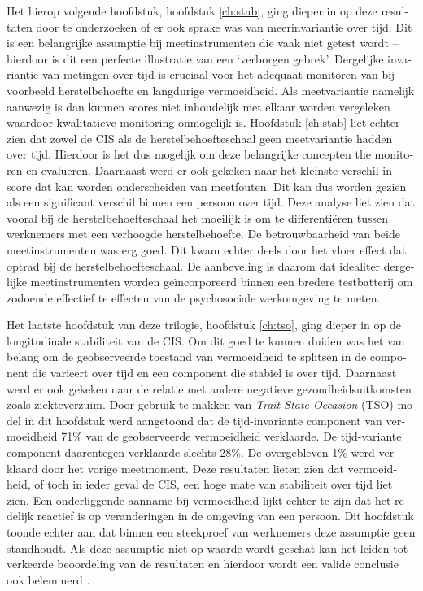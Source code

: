 \begin{otherlanguage}{dutch}
Het hierop volgende hoofdstuk, hoofdstuk \ref{ch:stab}, ging dieper in op deze resultaten door te onderzoeken of er ook sprake was van meerinvariantie over tijd. Dit is een belangrijke assumptie bij meetinstrumenten die vaak niet getest wordt -- hierdoor is dit een perfecte illustratie van een `verborgen gebrek'. Dergelijke invariantie van metingen over tijd is cruciaal voor het adequaat monitoren van bijvoorbeeld herstelbehoefte en langdurige vermoeidheid. Als meetvariantie namelijk aanwezig is dan kunnen scores niet inhoudelijk met elkaar worden vergeleken waardoor kwalitatieve monitoring onmogelijk is. Hoofdstuk \ref{ch:stab} liet echter zien dat zowel de CIS als de herstelbehoefteschaal geen meetvariantie hadden over tijd. Hierdoor is het dus mogelijk om deze belangrijke concepten the monitoren en evalueren. Daarnaast werd er ook gekeken naar het kleinste verschil in score dat kan worden onderscheiden van meetfouten. Dit kan dus worden gezien als een significant verschil binnen een persoon over tijd. Deze analyse liet zien dat vooral bij de herstelbehoefteschaal het moeilijk is om te differenti\"eren tussen werknemers met een verhoogde herstelbehoefte. De betrouwbaarheid van beide meetinstrumenten was erg goed. Dit kwam echter deels door het vloer effect dat optrad bij de herstelbehoefteschaal. De aanbeveling is daarom dat idealiter dergelijke meetinstrumenten worden ge\"incorporeerd binnen een bredere testbatterij om zodoende effectief te effecten van de psychosociale werkomgeving te meten. 

Het laatste hoofdstuk van deze trilogie, hoofdstuk \ref{ch:tso}, ging dieper in op de longitudinale stabiliteit van de CIS. Om dit goed te kunnen duiden was het van belang om de geobserveerde toestand van vermoeidheid te splitsen in de component die varieert over tijd en een component die stabiel is over tijd. Daarnaast werd er ook gekeken naar de relatie met andere negatieve gezondheidsuitkomsten zoals ziekteverzuim. Door gebruik te makken van \textit{Trait-State-Occasion} (TSO) model  \parencite{Prenoveau_2011,Prenoveau_2016} in dit hoofdstuk werd aangetoond dat de tijd-invariante component van vermoeidheid 71\% van de geobserveerde vermoeidheid verklaarde. De tijd-variante component daarentegen verklaarde slechts 28\%. De overgebleven 1\% werd verklaard door het vorige meetmoment. Deze resultaten lieten zien dat vermoeidheid, of toch in ieder geval de CIS, een hoge mate van stabiliteit over tijd liet zien. Een onderliggende aanname bij vermoeidheid lijkt echter te zijn dat het redelijk reactief is op veranderingen in de omgeving van een persoon. Dit hoofdstuk toonde echter aan dat binnen een steekproef van werknemers deze assumptie geen standhoudt. Als deze assumptie niet op waarde wordt geschat kan het leiden tot verkeerde beoordeling van de resultaten en hierdoor wordt een valide conclusie ook belemmerd \parencite{Hamaker_2015}.


\end{otherlanguage}
